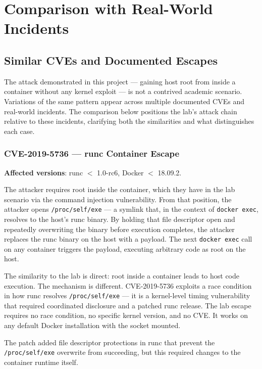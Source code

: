 \chapter{Comparison with Real-World Incidents}

\section{Similar CVEs and Documented Escapes}

The attack demonstrated in this project --- gaining host root from inside a container without any kernel exploit --- is not a contrived academic scenario. Variations of the same pattern appear across multiple documented CVEs and real-world incidents. The comparison below positions the lab's attack chain relative to these incidents, clarifying both the similarities and what distinguishes each case.

\subsection{CVE-2019-5736 --- runc Container Escape}

\textbf{Affected versions}: runc $<$ 1.0-rc6, Docker $<$ 18.09.2.

The attacker requires root inside the container, which they have in the lab scenario via the command injection vulnerability. From that position, the attacker opens \texttt{/proc/self/exe} --- a symlink that, in the context of \texttt{docker exec}, resolves to the host's runc binary. By holding that file descriptor open and repeatedly overwriting the binary before execution completes, the attacker replaces the runc binary on the host with a payload. The next \texttt{docker exec} call on any container triggers the payload, executing arbitrary code as root on the host.

The similarity to the lab is direct: root inside a container leads to host code execution. The mechanism is different. CVE-2019-5736 exploits a race condition in how runc resolves \texttt{/proc/self/exe} --- it is a kernel-level timing vulnerability that required coordinated disclosure and a patched runc release. The lab escape requires no race condition, no specific kernel version, and no CVE. It works on any default Docker installation with the socket mounted.

The patch added file descriptor protections in runc that prevent the \texttt{/proc/self/exe} overwrite from succeeding, but this required changes to the container runtime itself.


